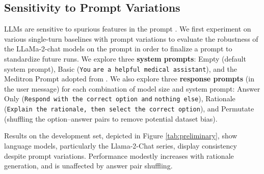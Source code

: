 \subsection{Sensitivity to Prompt Variations}\label{app:noninteractive}

LLMs are sensitive to spurious features in the prompt \cite{sclar2023quantifying}. We first experiment on various single-turn baselines with prompt variations to evaluate the robustness of the LLaMa-2-chat models \cite{touvron2023llama} on the prompt in order to finalize a prompt to standardize future runs. 
We explore three \textbf{system prompts}: Empty (default system prompt), Basic (\verb|You| \verb|are a helpful medical assistant|), and the Meditron Prompt adopted from \cite{chen2023meditron70b}.
We also explore three \textbf{response prompts} (in the user message) for each combination of model size and system prompt: Answer Only (\verb|Respond with the correct option and| \verb|nothing else|), Rationale (\verb|Explain the rationale, then select the correct option|), and Permutate (shuffling the option--answer pairs to remove potential dataset bias).

Results on the development set, depicted in Figure \ref{tab:preliminary}, show language models, particularly the Llama-2-Chat series, display consistency despite prompt variations. Performance modestly increases with rationale generation, and is unaffected by answer pair shuffling. 

